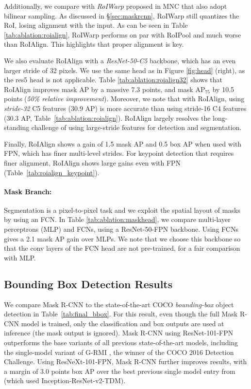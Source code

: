 \documentclass[10pt,twocolumn,letterpaper]{article}
\begin{document}
Additionally, we compare with \emph{RoIWarp} proposed in MNC \cite{Dai2016} that also adopt bilinear sampling. As discussed in \S\ref{sec:maskrcnn}, RoIWarp still quantizes the RoI, losing alignment with the input. As can be seen in Table \ref{tab:ablation:roialign}, RoIWarp performs on par with RoIPool and much worse than RoIAlign. This highlights that proper alignment is key.

We also evaluate RoIAlign with a \emph{ResNet-50-C5} backbone, which has an even larger stride of 32 pixels. We use the same head as in Figure \ref{fig:head} (right), as the res5 head is not applicable. Table \ref{tab:ablation:roialign32} shows that RoIAlign improves mask AP by a massive 7.3 points, and mask AP$_{75}$ by 10.5 points (\emph{50\% relative improvement}). Moreover, we note that with RoIAlign, using \emph{stride-32} C5 features (30.9 AP) is more accurate than using stride-16 C4 features (30.3 AP, Table~\ref{tab:ablation:roialign}). RoIAlign largely resolves the long-standing challenge of using large-stride features for detection and segmentation.

Finally, RoIAlign shows a gain of 1.5 mask AP and 0.5 box AP when used with FPN, which has finer multi-level strides. For keypoint detection that requires finer alignment, RoIAlign shows large gains even with FPN (Table~\ref{tab:roialign_keypoint}).

\paragraph{Mask Branch:} Segmentation is a pixel-to-pixel task and we exploit the spatial layout of masks by using an FCN. In Table \ref{tab:ablation:maskhead}, we compare multi-layer perceptrons (MLP) and FCNs, using a ResNet-50-FPN backbone. Using FCNs gives a 2.1 mask AP gain over MLPs. We note that we choose this backbone so that the conv layers of the FCN head are not pre-trained, for a fair comparison with MLP.  

\subsection{Bounding Box Detection Results}

We compare Mask R-CNN to the state-of-the-art COCO \emph{bounding-box} object detection in Table~\ref{tab:final_bbox}. For this result, even though the full Mask R-CNN model is trained, only the classification and box outputs are used at inference (the mask output is ignored). Mask R-CNN using ResNet-101-FPN outperforms the base variants of all previous state-of-the-art models, including the single-model variant of G-RMI \cite{Huang2017}, the winner of the COCO 2016 Detection Challenge. Using ResNeXt-101-FPN, Mask R-CNN further improves results, with a margin of 3.0 points box AP over the best previous single model entry from \cite{Shrivastava2016a} (which used Inception-ResNet-v2-TDM).
\end{document}
